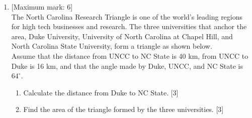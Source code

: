 \documentclass[12pt, twoside]{article}
\begin{document}
\begin{enumerate}
\newpage
    \item  {[Maximum mark: 6]} \\[0.3cm]
        The North Carolina Research Triangle is one of the world's leading regions for high tech businesses and research. The three universities that anchor the area, Duke University, University of North Carolina at Chapel Hill, and North Carolina State University, form a triangle as shown below. \\[0.25cm]
        Assume that the distance from UNCC to NC State is 40 km, from UNCC to Duke is 16 km, and that the angle made by Duke, UNCC, and NC State is $64^\circ$.
        \begin{center}
        \end{center} 
        \begin{enumerate}
            \item Calculate the distance from Duke to NC State. \hfill [3]
            \item Find the area of the triangle formed by the three universities. \hfill [3]
        \end{enumerate}

\end{enumerate}
\end{document}
